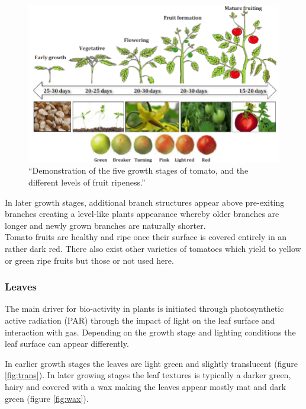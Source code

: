 \begin{figure}[H]
    \centering
    \includegraphics[width=1.0\textwidth]{user-view/growth_stages.png}
    \caption{\enquote{Demonstration of the five growth stages of tomato, and the different levels of fruit ripeness.} \cite{Shamshiri2018}}
    \label{growth-stages}
\end{figure}

In later growth stages, additional branch structures appear above pre-exiting branches creating a level-like
plants appearance whereby older branches are longer and newly grown branches are naturally shorter.\\

Tomato fruits are healthy and ripe once their surface is covered entirely in an rather dark red.
There also exist other varieties of tomatoes which yield to yellow or green ripe fruits but those
or not used here.

\subsubsection*{Leaves}

The main driver for bio-activity in plants is initiated through photosynthetic active radiation (PAR)
through the impact of light on the leaf surface and interaction with gas.
Depending on the growth stage and lighting conditions the leaf surface can appear differently.

In earlier growth stages the leaves are light green and slightly translucent (figure \ref{fig:trans}).
In later growing stages the leaf textures is typically a darker green, hairy and covered
with a wax making the leaves appear mostly mat and dark green (figure \ref{fig:wax}).

